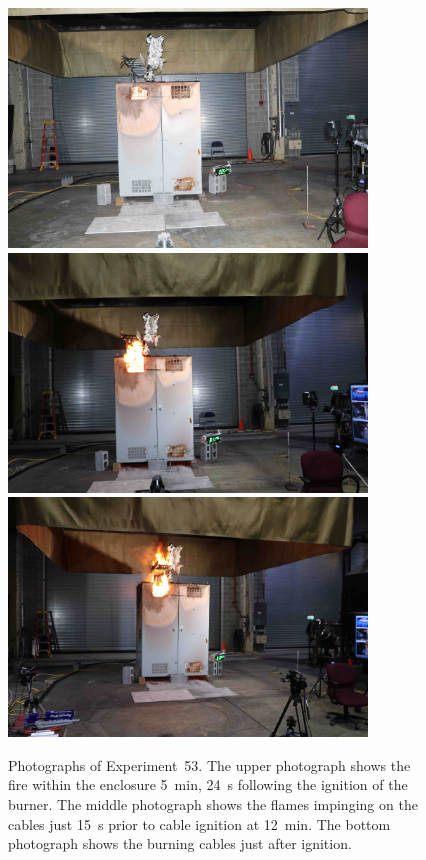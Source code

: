 \begin{figure}[p]
\centering
\includegraphics[height=2.50in]{../FIGURES/Test_53_5_min_24_s} \\
\includegraphics[height=2.50in]{../FIGURES/Test_53_11_min_45_s} \\
\includegraphics[height=2.50in]{../FIGURES/Test_53_ignition}
\caption[Photographs of Experiment~53]{Photographs of Experiment~53. The upper photograph shows the fire within the enclosure 5~min, 24~s following the ignition of the burner. The middle photograph shows the flames impinging on the cables just 15~s prior to cable ignition at 12~min. The bottom photograph shows the burning cables just after ignition.}
\label{fig:Test_53_photos}
\end{figure}


